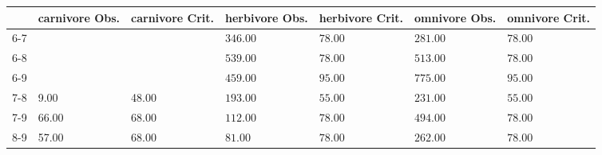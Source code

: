 \begin{table}[ht]
\centering
\begin{tabular}{rllllll}
  \toprule
 & carnivore Obs. & carnivore Crit. & herbivore Obs. & herbivore Crit. & omnivore Obs. & omnivore Crit. \\ 
  \midrule
6-7 &  &  & \(\mathbf{346.00}\) & \(\mathbf{78.00}\) & \(\mathbf{281.00}\) & \(\mathbf{78.00}\) \\ 
  6-8 &  &  & \(\mathbf{539.00}\) & \(\mathbf{78.00}\) & \(\mathbf{513.00}\) & \(\mathbf{78.00}\) \\ 
  6-9 &  &  & \(\mathbf{459.00}\) & \(\mathbf{95.00}\) & \(\mathbf{775.00}\) & \(\mathbf{95.00}\) \\ 
  7-8 & 9.00 & 48.00 & \(\mathbf{193.00}\) & \(\mathbf{55.00}\) & \(\mathbf{231.00}\) & \(\mathbf{55.00}\) \\ 
  7-9 & 66.00 & 68.00 & \(\mathbf{112.00}\) & \(\mathbf{78.00}\) & \(\mathbf{494.00}\) & \(\mathbf{78.00}\) \\ 
  8-9 & 57.00 & 68.00 & \(\mathbf{81.00}\) & \(\mathbf{78.00}\) & \(\mathbf{262.00}\) & \(\mathbf{78.00}\) \\ 
   \bottomrule
\end{tabular}
\end{table}
